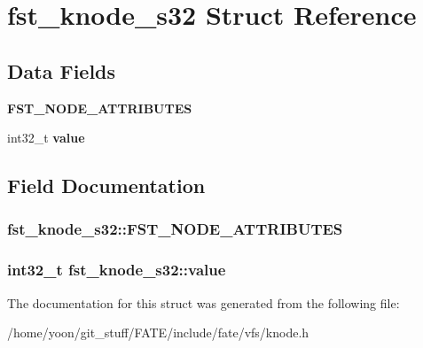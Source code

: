 \hypertarget{structfst__knode__s32}{\section{fst\-\_\-knode\-\_\-s32 Struct Reference}
\label{structfst__knode__s32}
}
\subsection*{Data Fields}
\begin{DoxyCompactItemize}
\item 
\hypertarget{structfst__knode__s32_ab13038e2455db510c7eb4b47a72a565d}{{\bfseries F\-S\-T\-\_\-\-N\-O\-D\-E\-\_\-\-A\-T\-T\-R\-I\-B\-U\-T\-E\-S}}\label{structfst__knode__s32_ab13038e2455db510c7eb4b47a72a565d}

\item 
\hypertarget{structfst__knode__s32_af2a3db55bf8c9412bfbbac3978dd4777}{int32\-\_\-t {\bfseries value}}\label{structfst__knode__s32_af2a3db55bf8c9412bfbbac3978dd4777}

\end{DoxyCompactItemize}


\subsection{Field Documentation}
\hypertarget{structfst__knode__s32_ab13038e2455db510c7eb4b47a72a565d}{
\subsubsection[{F\-S\-T\-\_\-\-N\-O\-D\-E\-\_\-\-A\-T\-T\-R\-I\-B\-U\-T\-E\-S}]{\setlength{\rightskip}{0pt plus 5cm}fst\-\_\-knode\-\_\-s32\-::\-F\-S\-T\-\_\-\-N\-O\-D\-E\-\_\-\-A\-T\-T\-R\-I\-B\-U\-T\-E\-S}}\label{structfst__knode__s32_ab13038e2455db510c7eb4b47a72a565d}
\hypertarget{structfst__knode__s32_af2a3db55bf8c9412bfbbac3978dd4777}{
\subsubsection[{value}]{\setlength{\rightskip}{0pt plus 5cm}int32\-\_\-t fst\-\_\-knode\-\_\-s32\-::value}}\label{structfst__knode__s32_af2a3db55bf8c9412bfbbac3978dd4777}


The documentation for this struct was generated from the following file\-:\begin{DoxyCompactItemize}
\item 
/home/yoon/git\-\_\-stuff/\-F\-A\-T\-E/include/fate/vfs/knode.\-h\end{DoxyCompactItemize}
